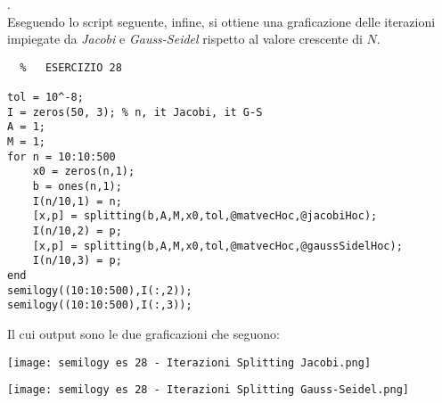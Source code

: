 \documentclass[a4paper]{report}
\begin{document}
.\\ Eseguendo lo script seguente, infine, si ottiene una graficazione delle iterazioni impiegate da \emph{Jacobi} e \emph{Gauss-Seidel} rispetto al valore crescente di $N$.\\
\begin{lstlisting}	%	ESERCIZIO 28

tol = 10^-8;
I = zeros(50, 3); % n, it Jacobi, it G-S
A = 1;
M = 1;
for n = 10:10:500
	x0 = zeros(n,1);
	b = ones(n,1);
	I(n/10,1) = n;
	[x,p] = splitting(b,A,M,x0,tol,@matvecHoc,@jacobiHoc);
	I(n/10,2) = p;
	[x,p] = splitting(b,A,M,x0,tol,@matvecHoc,@gaussSidelHoc);
	I(n/10,3) = p;
end
semilogy((10:10:500),I(:,2));
semilogy((10:10:500),I(:,3));
\end{lstlisting}
\newpage
Il cui output sono le due graficazioni che seguono:\\
\begin{center}	%
	\texttt{[image: semilogy es 28 - Iterazioni Splitting Jacobi.png]}
\end{center}
\begin{center}	%
	\texttt{[image: semilogy es 28 - Iterazioni Splitting Gauss-Seidel.png]}
\end{center}
\end{document}
